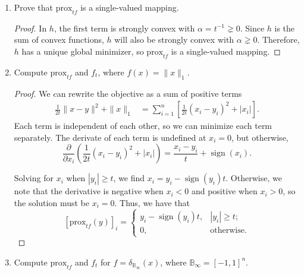 \documentclass[11pt]{amsart}
\newcommand{\prox}{\mathrm{prox}}
\begin{document}
\begin{enumerate}
\begin{enumerate}
\item Prove that $\prox_{t f}$ is a single-valued mapping. 
  \begin{proof}
    In $h$, the first term is strongly convex with $\alpha = t^{-1} \gneq
    0$. Since $h$ is the sum of convex functions, $h$ will also be strongly
    convex with $\alpha \gneq 0$. Therefore, $h$ has a unique global minimizer,
    so $\prox_{t f}$ is a single-valued mapping.
  \end{proof}

\item Compute $\prox_{t f}$ and $f_t$, where $f(x) = \|x\|_1$. 

  \begin{proof}
    We can rewrite the objective as a sum of positive terms
    \begin{align*}
      \frac{1}{2t}\|x-y\|^2 + \|x\|_1
      &= \sum_{i=1}^n\left[
        \frac{1}{2t}\left(x_i - y_i\right)^2
        +
        |x_i|
        \right].
    \end{align*}
    Each term is independent of each other, so we can minimize each term
    separately. The derivate of each term is undefined at $x_i = 0$, but
    otherwise,
    \begin{equation*}
      \frac{\partial}{\partial x_i}\left(
        \frac{1}{2t}\left(x_i - y_i\right)^2 + |x_i|
      \right)
      = \frac{x_i - y_i}{t} + \operatorname{sign}\left(x_i\right).
    \end{equation*}

    Solving for $x_i$ when $|y_i| \geq t$, we find
    $x_i = y_i - \operatorname{sign}\left(y_i\right)t$. Otherwise, we note that
    the derivative is negative when $x_i < 0$ and positive when $x_i > 0$, so
    the solution must be $x_i = 0$. Thus, we have that
    \begin{equation*}
      \left[\prox_{t f}(y)\right]_i = \begin{cases}
        y_i - \operatorname{sign}\left(y_i\right)t, & |y_i| \geq t; \\
        0, & \text{otherwise.}
      \end{cases}
    \end{equation*}
  \end{proof}

\item Compute $\prox_{t f}$ and $f_t$ for $f = \delta_{\mathbb{B}_{\infty}}(x)$, 
where $\mathbb{B}_\infty = [-1,1]^n$.


\end{enumerate}
\end{enumerate}
\end{document}
